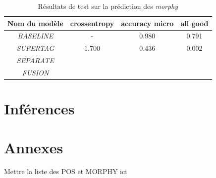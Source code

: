 \documentclass[a4paper]{article}
\begin{document}


\begin{table}[H]
    \centering
    \begin{tabular}{|c|c|c|c|}
        \hline
         Nom du modèle & crossentropy & accuracy micro & all good\\
         \hline
         \textit{BASELINE}& - & 0.980 & 0.791 \\
         \hline
         \textit{SUPERTAG}& 1.700 & 0.436 & 0.002\\
         \hline
         \textit{SEPARATE}&  &  & \\
         \hline
         \textit{FUSION}&  &  & \\
         \hline
    \end{tabular}
    \caption{Résultats de test sur la prédiction des \textit{morphy}}
    \label{tab: test morphy}
\end{table}


\section{Inférences}


\section{Annexes}

Mettre la liste des POS et MORPHY ici

\newpage

\printbibliography
\end{document}
